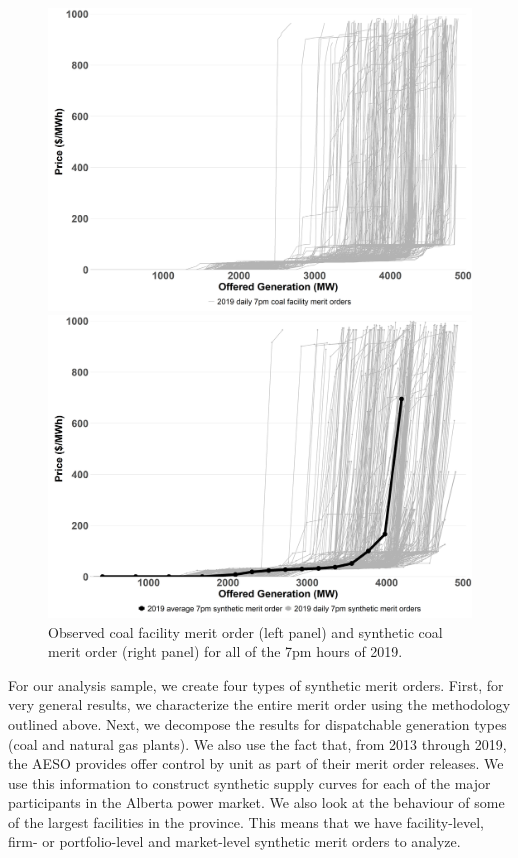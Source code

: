 \documentclass[12pt]{article}
\begin{document}
\begin{figure}[!htb]
    \centering
    \begin{minipage}{.5\textwidth}
        \centering
        \includegraphics[width=.9\textwidth]{../images/all_coal_merit.png}
    \end{minipage}%
    \begin{minipage}{0.5\textwidth}
        \centering
        \includegraphics[width=.9\textwidth]{../images/coal_synth_2019}
    \end{minipage}
    \caption{Observed coal facility merit order (left panel) and synthetic coal merit order (right panel) for all of the 7pm hours of 2019.}
    \label{fig:synth_coal_2019}
\end{figure}

For our analysis sample, we create four types of synthetic merit orders. First, for very general results, we characterize the entire merit order using the methodology outlined above. Next, we decompose the results for dispatchable generation types (coal and natural gas plants). We also use the fact that, from 2013 through 2019, the AESO provides offer control by unit as part of their merit order releases. We use this information to construct synthetic supply curves for each of the major participants in the Alberta power market. We also look at the behaviour of some of the largest facilities in the province. This means that we have facility-level, firm- or portfolio-level and market-level synthetic merit orders to analyze.
\end{document}
